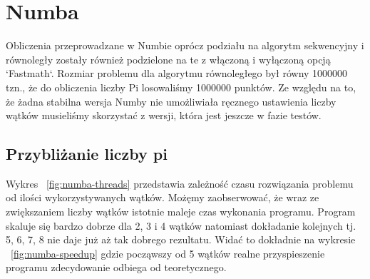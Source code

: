 \section{Numba}
Obliczenia przeprowadzane w Numbie oprócz podziału na algorytm sekwencyjny i równoległy
zostały również podzielone na te z włączoną i wyłączoną  opcją `Fastmath`.
Rozmiar problemu dla algorytmu równoległego był równy 1000000 tzn., że do obliczenia
liczby Pi losowaliśmy 1000000 punktów.
Ze względu na to, że żadna stabilna wersja Numby nie umożliwiała ręcznego ustawienia
liczby wątków musieliśmy skorzystać z wersji, która jest jeszcze w fazie testów.


\subsection{Przybliżanie liczby pi}

\begin{figure*}
    \centering
    \begin{minipage}[b]{.45\textwidth}
        \centering
        
        \caption{Przyspieszenie liczenia liczby $\pi$ w Numbie}
        \label{fig:numba-speedup}
    \end{minipage}
    \hfill
    \begin{minipage}[b]{.45\textwidth}
        \centering
        
        \caption{Czas wykonania algorytmu w Numbie w zależności od liczby wątków}
        \label{fig:numba-threads}
    \end{minipage}
\end{figure*}

\begin{figure*}
    \centering
    
    \caption{Czas równoległego wykonania algorytmu w Numbie w zależności od rozmiaru problemu}
    \label{fig:numba-parallel-sizes}
\end{figure*}

Wykres ~\ref{fig:numba-threads} przedstawia zależność czasu rozwiązania problemu od ilości wykorzystywanych
wątków. Możęmy zaobserwować, że wraz ze zwiększaniem liczby wątków istotnie maleje czas
wykonania programu. Program skaluje się bardzo dobrze dla 2, 3 i 4 wątków natomiast
dokładanie kolejnych tj. 5, 6, 7, 8 nie daje już aż tak dobrego rezultatu. Widać to dokładnie
na wykresie ~\ref{fig:numba-speedup} gdzie począwszy od 5 wątków realne przyspieszenie
programu zdecydowanie odbiega od teoretycznego.




